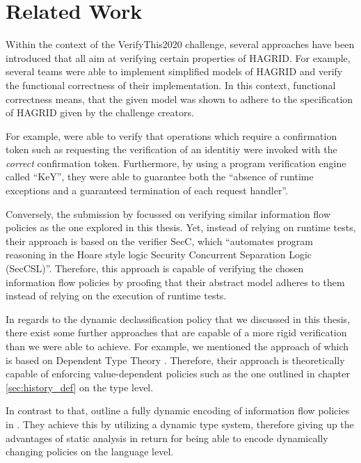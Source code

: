 
\section{Related Work}
\label{sec:related_work}

Within the context of the VerifyThis2020 challenge, several approaches have been introduced that all aim at verifying certain properties of HAGRID.
For example, several teams were able to implement simplified models of HAGRID and verify the functional correctness of their implementation. In this context, functional correctness means, that the given model was shown to adhere to the specification of HAGRID given by the challenge creators. 

For example, \citeauthor{VTLTC2020/KeY} were able to verify that operations which require a confirmation token such as requesting the verification of an identitiy were invoked with the \emph{correct} confirmation token. Furthermore, by using a program verification engine called ``KeY'', they were able to guarantee both the ``absence of runtime exceptions and a guaranteed termination of each request handler''\cite{VTLTC2020/KeY}.

Conversely, the submission by \citeauthor{VTLTC2020/IFVerify} focussed on verifying similar information flow policies as the one explored in this thesis. Yet, instead of relying on runtime tests, their approach is based on the verifier SecC, which ``automates program reasoning in the Hoare style logic Security Concurrent Separation Logic (SecCSL)''\cite{VTLTC2020/IFVerify}. Therefore, this approach is capable of verifying the chosen information flow policies by proofing that their abstract model adheres to them instead of relying on the execution of runtime tests. 

\bigskip
In regards to the dynamic declassification policy that we discussed in this thesis, there exist some further approaches that are capable of a more rigid verification than we were able to achieve. For example, we mentioned the approach of \citeauthor{Lourenco_Caires_15} which is based on Dependent Type Theory \cite{Lourenco_Caires_15}. Therefore, their approach is theoretically capable of enforcing value-dependent policies such as the one outlined in chapter \ref{sec:history_def} on the type level.

In contrast to that, \citeauthor{austin2009efficient} outline a fully dynamic encoding of information flow policies in  \cite{austin2009efficient}. They achieve this by utilizing a dynamic type system, therefore giving up the advantages of static analysis in return for being able to encode dynamically changing policies on the language level.
